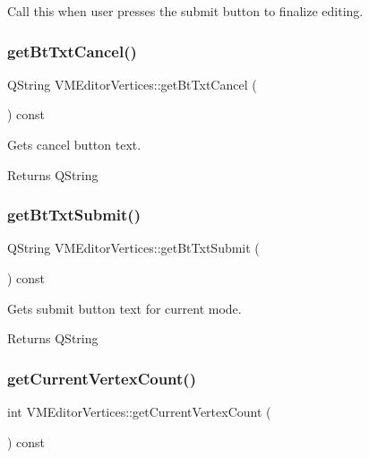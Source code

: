 Call this when user presses the submit button to finalize editing. 

\mbox{\label{class_v_m_editor_vertices_a0db2a882a7334d63902bbb5e93745efe}} 
\subsubsection{\texorpdfstring{getBtTxtCancel()}{getBtTxtCancel()}}
{\footnotesize\ttfamily Q\+String V\+M\+Editor\+Vertices\+::get\+Bt\+Txt\+Cancel (\begin{DoxyParamCaption}{ }\end{DoxyParamCaption}) const}



Gets cancel button text. 

\begin{DoxyReturn}{Returns}
Q\+String 
\end{DoxyReturn}
\mbox{\label{class_v_m_editor_vertices_added9bc98a3854b9639ea4f1e4c58e25}} 
\subsubsection{\texorpdfstring{getBtTxtSubmit()}{getBtTxtSubmit()}}
{\footnotesize\ttfamily Q\+String V\+M\+Editor\+Vertices\+::get\+Bt\+Txt\+Submit (\begin{DoxyParamCaption}{ }\end{DoxyParamCaption}) const}



Gets submit button text for current mode. 

\begin{DoxyReturn}{Returns}
Q\+String 
\end{DoxyReturn}
\mbox{\label{class_v_m_editor_vertices_ac126c0b810f29c803f54cea4a50b6953}} 
\subsubsection{\texorpdfstring{getCurrentVertexCount()}{getCurrentVertexCount()}}
{\footnotesize\ttfamily int V\+M\+Editor\+Vertices\+::get\+Current\+Vertex\+Count (\begin{DoxyParamCaption}{ }\end{DoxyParamCaption}) const}



